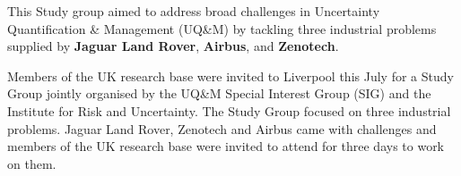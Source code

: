 \documentclass[11pt]{article}%
\begin{document}
%
%
\begin{minipage}[t]{.66\linewidth} %

\vspace{-40pt}

\hypertarget{StudyGroup}{} %

This Study group aimed to address broad challenges in Uncertainty Quantification \& Management (UQ\&M) by tackling three industrial problems supplied by \textbf{Jaguar Land Rover}, \textbf{Airbus}, and \textbf{Zenotech}. 

Members of the UK research base were invited to Liverpool this July for a Study Group jointly organised by the UQ\&M Special Interest Group (SIG) 
and the Institute for Risk and Uncertainty. 
The Study Group focused on three industrial problems. Jaguar Land Rover, Zenotech and Airbus came with challenges and members of the UK research base were invited to attend for three days to work on them. 
\begin{figure}
                \centering
               {}
\end{figure}
\end{minipage}
\end{document}
